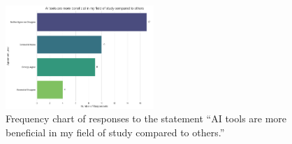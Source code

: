 \documentclass[12pt]{article}
\begin{document}
\begin{figure}[htbp]
  \centering
  \includegraphics[width=0.5\textwidth]{fig9.png} %
  \caption{\centering Frequency chart of responses to the statement “AI tools are more beneficial in my field of study compared to others.”}
  \label{fig:example1}
\end{figure}
\end{document}
